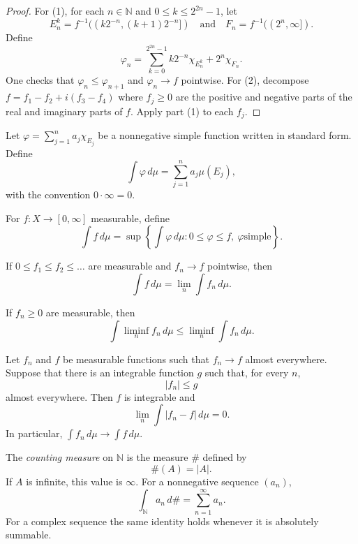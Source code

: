 \begin{proof}
For (1), for each $n\in\mathbb{N}$ and $0\leq
k\leq 2^{2n}-1$, let
$$
E_n^k = f^{-1}((k2^{-n}, (k+1)2^{-n}]) \quad
\text{and} \quad F_n = f^{-1}((2^n, \infty]).
$$
Define
$$
\varphi_n = \sum_{k=0}^{2^{2n}-1}
k2^{-n}\chi_{E_n^k} + 2^n\chi_{F_n}.
$$
One checks that $\varphi_n \leq
\varphi_{n+1}$ and $\varphi_n \to f$
pointwise. For (2), decompose $f = f_1 - f_2
+ i(f_3 - f_4)$ where $f_j \geq 0$ are the
positive and negative parts of the real and
imaginary parts of $f$. Apply part (1) to
each $f_j$.
\end{proof}

\begin{definition}
\label{%
definition-integral-nonnegative-simple}
Let $\varphi=\sum_{j=1}^n a_j\chi_{E_j}$ be a
nonnegative simple function written in
standard form. Define
$$
\int \varphi\,d\mu = \sum_{j=1}^n
a_j\mu(E_j),
$$
with the convention $0\cdot\infty=0$.
\end{definition}

\begin{definition}
\label{definition-integral-nonnegative}
For $f:X\to[0,\infty]$ measurable, define
$$
\int f\,d\mu = \sup\left\{\int \varphi\,d\mu:
0\leq \varphi\leq f,\ \varphi\text{
simple}\right\}.
$$
\end{definition}

\begin{theorem}
\label{theorem-monotone-convergence}
If $0\leq f_1\leq f_2\leq\ldots$ are
measurable and $f_n\to f$ pointwise, then
$$
\int f\,d\mu = \lim_n \int f_n\,d\mu.
$$
\end{theorem}

\begin{lemma}[Fatou]
\label{lemma-fatou}
If $f_n\geq 0$ are measurable, then
$$
\int \liminf_n f_n\,d\mu \leq \liminf_n \int
f_n\,d\mu.
$$
\end{lemma}

\begin{theorem}
\label{theorem-dominated-convergence}
Let $f_n$ and $f$ be measurable functions
such that $f_n\to f$ almost everywhere.
Suppose that there is an integrable function
$g$ such that, for every $n$,
$$
|f_n|\leq g
$$
almost everywhere. Then $f$ is integrable
and
$$
\lim_n\int |f_n-f|\,d\mu=0.
$$
In particular, $\int f_n\,d\mu\to\int
f\,d\mu$.
\end{theorem}

\begin{definition}
\label{definition-counting-measure}
The {\it counting measure} on
$\mathbb{N}$ is the measure $\#$ defined by
$$
\#(A)=|A|.
$$
If $A$ is infinite, this value is $\infty$.
For a nonnegative sequence $(a_n)$,
$$
\int_{\mathbb{N}} a_n\,d\#
=
\sum_{n=1}^{\infty}a_n.
$$
For a complex sequence the same identity
holds whenever it is absolutely summable.
\end{definition}

